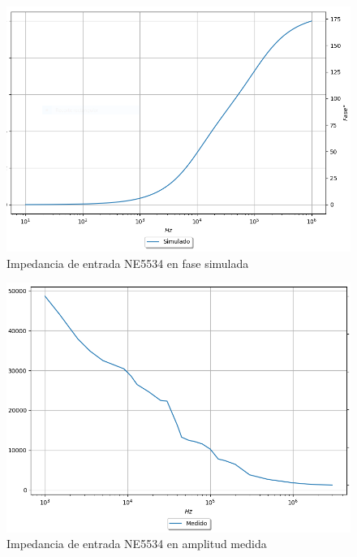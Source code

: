 \begin{figure}[H]	
	\centering
	\includegraphics[width=\textwidth]{Ejercicio2/Imagenes/Zin_F_NE5534_Simulado.png}
	\caption{Impedancia de entrada NE5534 en fase simulada}
\end{figure}

\begin{figure}[H]	
	\centering
	\includegraphics[width=\textwidth]{Ejercicio2/Imagenes/Zin_A_NE5534_Medido.png}
	\caption{Impedancia de entrada NE5534 en amplitud medida}
\end{figure}


